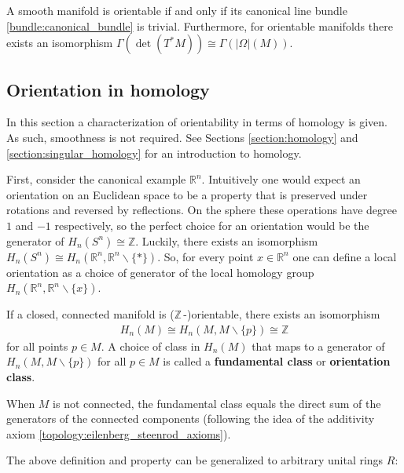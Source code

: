     \begin{property}[Orientability]
        A smooth manifold is orientable if and only if its canonical line bundle \ref{bundle:canonical_bundle} is trivial. Furthermore, for orientable manifolds there exists an isomorphism $\Gamma(\det(T^*M))\cong\Gamma(|\Omega|(M))$.
    \end{property}

\subsection{Orientation in homology}

    In this section a characterization of orientability in terms of homology is given. As such, smoothness is not required. See Sections \ref{section:homology} and \ref{section:singular_homology} for an introduction to homology.

    First, consider the canonical example $\mathbb{R}^n$. Intuitively one would expect an orientation on an Euclidean space to be a property that is preserved under rotations and reversed by reflections. On the sphere these operations have degree $1$ and $-1$ respectively, so the perfect choice for an orientation would be the generator of $H_n(S^n)\cong\mathbb{Z}$. Luckily, there exists an isomorphism $H_n(S^n)\cong H_n(\mathbb{R}^n,\mathbb{R}^n\backslash\{\ast\})$. So, for every point $x\in\mathbb{R}^n$ one can define a local orientation as a choice of generator of the local homology group $H_n(\mathbb{R}^n,\mathbb{R}^n\backslash\{x\})$.


    \begin{property}[Orientability]\label{bundle:orientation_class}
        If a closed, connected manifold is ($\mathbb{Z}\,$-)orientable, there exists an isomorphism
        \begin{gather}
            H_n(M)\cong H_n(M,M\backslash\{p\})\cong\mathbb{Z}
        \end{gather}
        for all points $p\in M$. A choice of class in $H_n(M)$ that maps to a generator of $H_n(M,M\backslash\{p\})$ for all $p\in M$ is called a \textbf{fundamental class} or \textbf{orientation class}.

        When $M$ is not connected, the fundamental class equals the direct sum of the generators of the connected components (following the idea of the additivity axiom \ref{topology:eilenberg_steenrod_axioms}).
    \end{property}
    The above definition and property can be generalized to arbitrary unital rings $R$:

